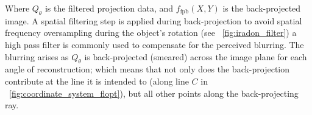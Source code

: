Where \(Q_\theta \) is the filtered projection data, and \(f_{\text{fpb}}(X,Y)\) is the back-projected image.
A spatial filtering step is applied during back-projection to avoid spatial frequency oversampling during the object’s rotation (see \figurename~\ref{fig:iradon_filter})
a high pass filter is commonly used to compensate for the perceived blurring.
The blurring arises as \(Q_\theta \) is back-projected (smeared) across the image plane for each angle of reconstruction; which means that not only does the back-projection contribute at the line it is intended to (along line \(C\) in \figurename~\ref{fig:coordinate_system_flopt}), but all other points along the back-projecting ray.
